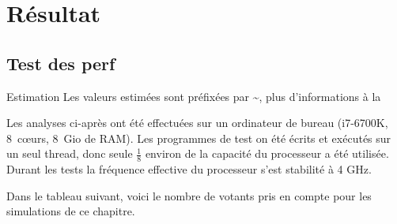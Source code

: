 \documentclass[../report]{subfiles}
\begin{document}
\part{Résultat}

\chapter{Test des perf}


\begin{nota}{Estimation}
	Les valeurs estimées sont préfixées par \textasciitilde{}, plus d'informations à la 
\end{nota}

Les analyses ci-après ont été effectuées sur un ordinateur de bureau (i7-6700K, 8~cœurs, 8~Gio de RAM).
Les programmes de test on été écrits et exécutés sur un seul thread, donc seule $\frac{1}{8}$ environ de 
la capacité du processeur a été utilisée.
Durant les tests la fréquence effective du processeur s'est stabilité à 4 GHz.

Dans le tableau suivant, voici le nombre de votants pris en compte pour les simulations de ce chapitre.
\end{document}
